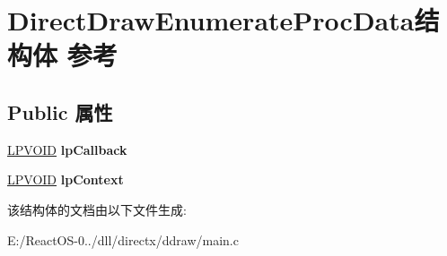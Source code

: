 \hypertarget{struct_direct_draw_enumerate_proc_data}{}\section{Direct\+Draw\+Enumerate\+Proc\+Data结构体 参考}
\label{struct_direct_draw_enumerate_proc_data}
\subsection*{Public 属性}
\begin{DoxyCompactItemize}
\item 
\mbox{\label{struct_direct_draw_enumerate_proc_data_a9cf1375f0bc5dc408be8d3ef04682c2f}} 
\hyperlink{interfacevoid}{L\+P\+V\+O\+ID} {\bfseries lp\+Callback}
\item 
\mbox{\label{struct_direct_draw_enumerate_proc_data_acb5a7268e34079cd345f38c1d8416ceb}} 
\hyperlink{interfacevoid}{L\+P\+V\+O\+ID} {\bfseries lp\+Context}
\end{DoxyCompactItemize}


该结构体的文档由以下文件生成\+:\begin{DoxyCompactItemize}
\item 
E\+:/\+React\+O\+S-\/0../dll/directx/ddraw/main.\+c\end{DoxyCompactItemize}
